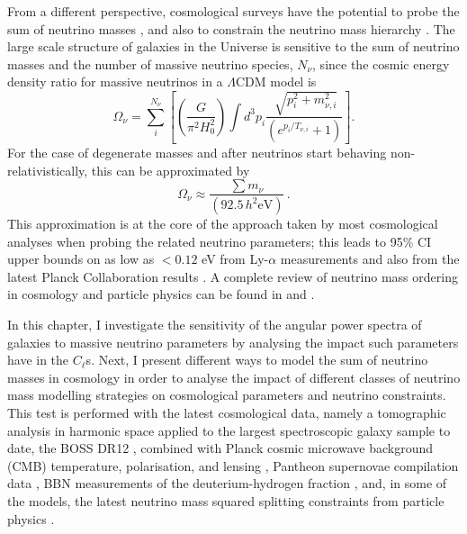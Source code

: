 \qquad From a different perspective, cosmological surveys have the potential to probe the sum of neutrino masses \citep{2007FBA,Thomas2010Neutr}, and also to constrain the neutrino mass hierarchy \citep{2003HannestadNeutrino,2016Hannestad}. The large scale structure of galaxies in the Universe is sensitive to the sum of neutrino masses and the number of massive neutrino species, $N_{\nu}$, since the cosmic energy density ratio for massive neutrinos in a $\Lambda$CDM model is
\begin{equation}
\label{Eq:NeutrinoOmega}
    \Omega_{\nu} = \sum_i^{N_{\nu}}\left[\left(\frac{G}{\pi^2H_0^2}\right)\int d^3p_i \frac{\sqrt[]{p_i^2 + m_{\nu,i}^2}}{(e^{p_i/T_{\nu,i}} + 1)} \right].
\end{equation} 
\noindent For the case of degenerate masses and after neutrinos start behaving non-relativistically, this can be approximated by \citep{Thomas2010Neutr}
\begin{equation}
    \Omega_{\nu} \approx \frac{\sum m_{\nu}}{(92.5\, h^2\text{eV})}\, .
\end{equation}
This approximation is at the core of the approach taken by most cosmological analyses when probing the related neutrino parameters; this leads to  95\% CI upper bounds on \NM{} as low as $< 0.12$ eV from Ly-$\alpha$ measurements \citep{2015PalanqueLyman-Alpha} and also from the latest Planck Collaboration results \citep{2018PlanckCosmology}. A complete review of neutrino mass ordering in cosmology and particle physics can be found in \cite{2012Julien-Deg} and \cite{2018MassOrdering}.

\qquad In this chapter, I investigate the sensitivity of the angular power spectra of galaxies to massive neutrino parameters by analysing the impact such parameters have in the $C_{\ell}$s. Next, I present different ways to model the sum of neutrino masses in cosmology in order to analyse the impact of different classes of neutrino mass modelling strategies on cosmological parameters and neutrino constraints. This test is performed with the latest cosmological data, namely a tomographic analysis in harmonic space applied to the largest spectroscopic galaxy sample to date, the BOSS DR12 \citep[][-- also presented in Chapter \ref{Chap:BOSS}]{2018LoureiroBOSS}, combined with Planck cosmic microwave background (CMB) temperature, polarisation, and lensing \citep{PlanckCosmology2016}, Pantheon supernovae compilation data \citep{2018Pantheon}, BBN measurements of the deuterium-hydrogen fraction \citep{2018BBN-Measurements}, and, in some of the models, the latest neutrino mass squared splitting constraints from particle physics \citep{2014Gonzalez-GarciaNeutrino}.



